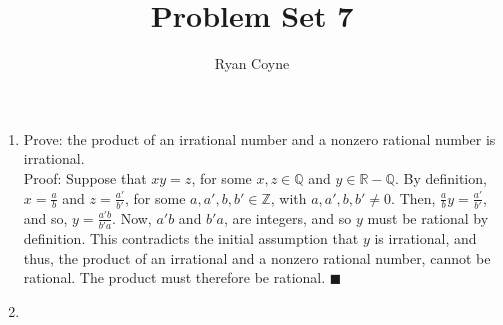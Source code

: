 \documentclass[12pt]{article}
\newcommand{\Z}{\mathbb{Z}}
\newcommand{\R}{\mathbb{R}}
\newcommand{\Q}{\mathbb{Q}}
\newcommand{\qed}{\(\blacksquare\)}
\begin{document}
    \title{Problem Set 7}
    \author{Ryan Coyne}
    \maketitle

    \begin{enumerate}
        \item Prove: the product of an irrational number and a nonzero rational number is irrational.\\ Proof: Suppose that \(xy=z\), for some \(x,z\in\Q\) and \(y\in\R-\Q\). By definition, \(x=\frac{a}{b}\) and \(z=\frac{a'}{b'}\), for some \(a,a',b,b'\in\Z\), with \(a,a',b,b'\neq0\). Then, \(\frac{a}{b}y=\frac{a'}{b'}\), and so, \(y=\frac{a'b}{b'a}\). Now, \(a'b\) and \(b'a\), are integers, and so \(y\) must be rational by definition. This contradicts the initial assumption that \(y\) is irrational, and thus, the product of an irrational and a nonzero rational number, cannot be rational. The product must therefore be rational. \qed
        \item  
    \end{enumerate}
\end{document}

